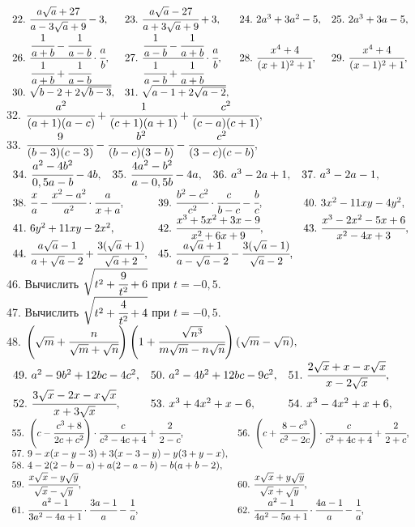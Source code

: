 $\begin{array}{llll}
22.\ \cfrac{a\sqrt{a}+27}{a-3\sqrt{a}+9}-3,&
23.\ \cfrac{a\sqrt{a}-27}{a+3\sqrt{a}+9}+3,&
24.\ 2a^3+3a^2-5,&
25.\ 2a^3+3a-5,\\
26.\ \cfrac{\cfrac{1}{a+b}-\cfrac{1}{a-b}}{\cfrac{1}{a+b}+\cfrac{1}{a-b}}\cdot\cfrac{a}{b},&
27.\ \cfrac{\cfrac{1}{a-b}-\cfrac{1}{a+b}}{\cfrac{1}{a-b}+\cfrac{1}{a+b}}\cdot\cfrac{a}{b},&
28.\ \cfrac{x^4+4}{(x+1)^2+1},&
29.\ \cfrac{x^4+4}{(x-1)^2+1},\\
30.\ \sqrt{b-2+2\sqrt{b-3}},&
31.\ \sqrt{a-1+2\sqrt{a-2}},
\end{array}$\\
32. $\cfrac{a^2}{(a+1)(a-c)}+\cfrac{1}{(c+1)(a+1)}+\cfrac{c^2}{(c-a)(c+1)},$\\
33. $\cfrac{9}{(b-3)(c-3)}-\cfrac{b^2}{(b-c)(3-b)}-\cfrac{c^2}{(3-c)(c-b)},$\\
$\begin{array}{llll}
34.\ \cfrac{a^2-4b^2}{0,5a-b}-4b,&
35.\ \cfrac{4a^2-b^2}{a-0,5b}-4a,&
36.\ a^3-2a+1,&
37.\ a^3-2a-1,\end{array}$\\ $\begin{array}{lll}
38.\ \cfrac{x}{a}-\cfrac{x^2-a^2}{a^2}\cdot\cfrac{a}{x+a},&
39.\ \cfrac{b^2-c^2}{c^2}\cdot\cfrac{c}{b-c}-\cfrac{b}{c},&
40.\ 3x^2-11xy-4y^2,\\
41.\ 6y^2+11xy-2x^2,&
42.\ \cfrac{x^3+5x^2+3x-9}{x^2+6x+9},&
43.\ \cfrac{x^3-2x^2-5x+6}{x^2-4x+3},\\
44.\ \cfrac{a\sqrt{a}-1}{a+\sqrt{a}-2}+\cfrac{3(\sqrt{a}+1)}{\sqrt{a}+2},&
45.\ \cfrac{a\sqrt{a}+1}{a-\sqrt{a}-2}-\cfrac{3(\sqrt{a}-1)}{\sqrt{a}-2},
\end{array}$\\
46. Вычислить $\sqrt{t^2+\cfrac{9}{t^2}+6}$ при $t=-0,5.$\\
47. Вычислить $\sqrt{t^2+\cfrac{4}{t^2}+4}$ при $t=-0,5.$\\
48. $\left(\sqrt{m}+\cfrac{n}{\sqrt{m}+\sqrt{n}}\right)\left(1+\cfrac{\sqrt{n^3}}{m\sqrt{m}-n\sqrt{n}}\right)(
\sqrt{m}-\sqrt{n}),$\\
$\begin{array}{llll}
49.\ a^2-9b^2+12bc-4c^2,&
50.\ a^2-4b^2+12bc-9c^2,&
51.\ \cfrac{2\sqrt{x}+x-x\sqrt{x}}{x-2\sqrt{x}},\\
52.\ \cfrac{3\sqrt{x}-2x-x\sqrt{x}}{x+3\sqrt{x}},&
53.\ x^3+4x^2+x-6,&
54.\ x^3-4x^2+x+6,\end{array}$\\ $\begin{array}{ll}
55.\ \left(c-\cfrac{c^3+8}{2c+c^2}\right)\cdot\cfrac{c}{c^2-4c+4}+\cfrac{2}{2-c},&
56.\ \left(c+\cfrac{8-c^3}{c^2-2c}\right)\cdot\cfrac{c}{c^2+4c+4}+\cfrac{2}{2+c},\\
57.\ 9-x(x-y-3)+3(x-3-y)-y(3+y-x),\\
58.\ 4-2(2-b-a)+a(2-a-b)-b(a+b-2),\\
59.\ \cfrac{x\sqrt{x}-y\sqrt{y}}{\sqrt{x}-\sqrt{y}},&
60.\ \cfrac{x\sqrt{x}+y\sqrt{y}}{\sqrt{x}+\sqrt{y}},\\
61.\ \cfrac{a^2-1}{3a^2-4a+1}\cdot\cfrac{3a-1}{a}-\cfrac{1}{a},&
62.\ \cfrac{a^2-1}{4a^2-5a+1}\cdot\cfrac{4a-1}{a}-\cfrac{1}{a},
\end{array}$\\
